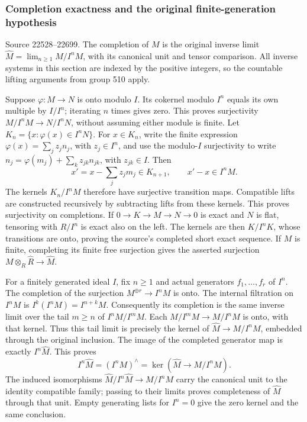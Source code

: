 \subsubsection{Completion exactness and the original finite-generation hypothesis}\label{algebra-proof-014-completion-exactness-and-the-original-finite-generation-hypothesis}

Source 22528--22699. The completion of \(M\) is the original inverse limit \(\widehat M=\lim_{n\geq1}M/I^nM\), with its canonical unit and tensor comparison. All inverse systems in this section are indexed by the positive integers, so the countable lifting arguments from group 510 apply.

Suppose \(\varphi:M\to N\) is onto modulo \(I\). Its cokernel modulo \(I^n\) equals its own multiple by \(I/I^n\); iterating \(n\) times gives zero. This proves surjectivity \(M/I^nM\to N/I^nN\), without assuming either module is finite. Let \(K_n=\{x:\varphi(x)\in I^nN\}\). For \(x\in K_n\), write the finite expression \(\varphi(x)=\sum_jz_jn_j\), with \(z_j\in I^n\), and use the modulo-\(I\) surjectivity to write \(n_j=\varphi(m_j)+\sum_kz_{jk}n_{jk}\), with \(z_{jk}\in I\). Then \[
x'=x-\sum_jz_jm_j\in K_{n+1},
\qquad x'-x\in I^nM .
\] The kernels \(K_n/I^nM\) therefore have surjective transition maps. Compatible lifts are constructed recursively by subtracting lifts from these kernels. This proves surjectivity on completions. If \(0\to K\to M\to N\to0\) is exact and \(N\) is flat, tensoring with \(R/I^n\) is exact also on the left. The kernels are then \(K/I^nK\), whose transitions are onto, proving the source's completed short exact sequence. If \(M\) is finite, completing its finite free surjection gives the asserted surjection \(M\otimes_R\widehat R\to\widehat M\).

For a finitely generated ideal \(I\), fix \(n\geq1\) and actual generators \(f_1,\ldots,f_r\) of \(I^n\). The completion of the surjection \(M^{\oplus r}\to I^nM\) is onto. The internal filtration on \(I^nM\) is \(I^k(I^nM)=I^{n+k}M\). Consequently its completion is the same inverse limit over the tail \(m\geq n\) of \(I^nM/I^mM\). Each \(M/I^mM\to M/I^nM\) is onto, with that kernel. Thus this tail limit is precisely the kernel of \(\widehat M\to M/I^nM\), embedded through the original inclusion. The image of the completed generator map is exactly \(I^n\widehat M\). This proves \[
I^n\widehat M=(I^nM)^\wedge
 =\ker(\widehat M\to M/I^nM).
\] The induced isomorphisms \(\widehat M/I^n\widehat M\to M/I^nM\) carry the canonical unit to the identity compatible family; passing to their limits proves completeness of \(\widehat M\) through that unit. Empty generating lists for \(I^n=0\) give the zero kernel and the same conclusion.

